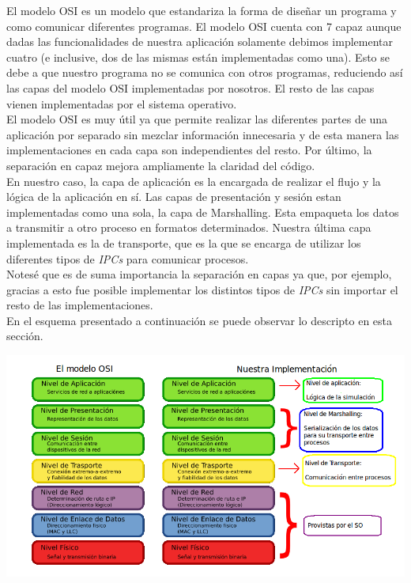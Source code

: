\documentclass[a4paper,10pt]{article}
\begin{document}
El modelo OSI es un modelo que estandariza la forma de diseñar un programa y como comunicar diferentes programas. El modelo OSI cuenta con 7 capaz aunque dadas las funcionalidades de nuestra aplicación solamente debimos implementar cuatro (e inclusive, dos de las
  mismas están implementadas como una). Esto se debe a que nuestro programa no se comunica con otros programas, reduciendo así las capas del modelo OSI implementadas por nosotros.
  El resto de las capas vienen implementadas por el sistema operativo.\\

El modelo OSI es muy útil ya que permite realizar las diferentes partes de una aplicación por separado sin mezclar información innecesaria y de esta manera las implementaciones 
en cada capa son independientes del resto. Por último, la separación en capaz mejora ampliamente la claridad del código.\\

En nuestro caso, la capa de aplicación es la encargada de realizar el flujo y la lógica de la aplicación en sí. Las capas de presentación y sesión estan implementadas como una sola,
 la capa de Marshalling. Esta empaqueta los datos a transmitir a otro proceso en formatos determinados. 
 Nuestra última capa implementada es la de transporte, que es la que se encarga de utilizar los diferentes tipos de \textit{IPCs} para comunicar procesos.\\

Notesé que es de suma importancia la separación en capas ya que, por ejemplo, gracias a esto fue posible implementar los distintos tipos de \textit{IPCs} sin importar el resto de las implementaciones.\\

En el esquema presentado a continuación se puede observar lo descripto en esta sección. \\

\begin{center}
 \includegraphics[scale=0.6]{./images/modelo-osi_nuestro.png}
\end{center}
\end{document}
